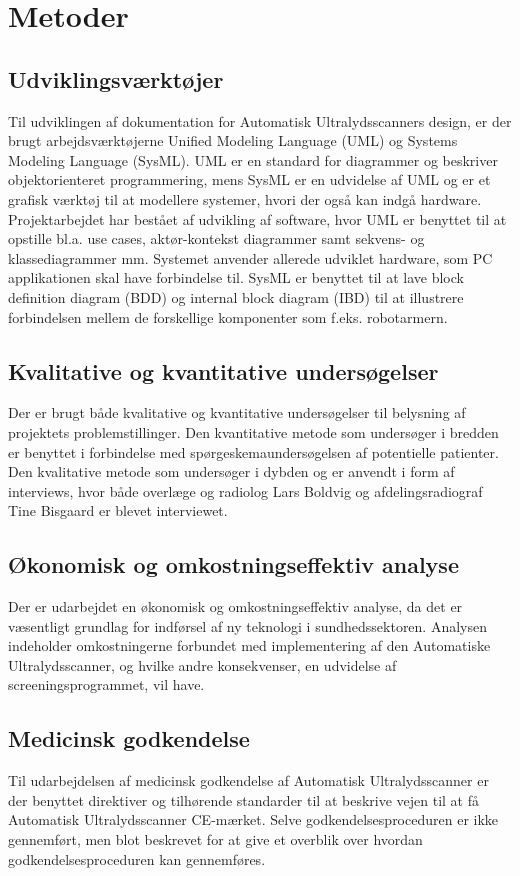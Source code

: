 \chapter{Metoder}\label{Metoder}

\section{Udviklingsværktøjer} 
Til udviklingen af dokumentation for Automatisk Ultralydsscanners design, er der brugt arbejdsværktøjerne Unified Modeling Language (UML) og Systems Modeling Language (SysML). UML er en standard for diagrammer og beskriver objektorienteret programmering, mens SysML er en udvidelse af UML og er et grafisk værktøj til at modellere systemer, hvori der også kan indgå hardware. Projektarbejdet har bestået af udvikling af software, hvor  UML er benyttet til at opstille bl.a. use cases, aktør-kontekst diagrammer samt sekvens- og klassediagrammer mm. Systemet anvender allerede udviklet hardware, som PC applikationen skal have forbindelse til. SysML er benyttet til at lave block definition diagram (BDD) og internal block diagram (IBD) til at illustrere forbindelsen mellem de forskellige komponenter som f.eks. robotarmern. \cite{UML} \cite{SysML}

\section{Kvalitative og kvantitative undersøgelser}
Der er brugt både kvalitative og kvantitative undersøgelser til belysning af projektets problemstillinger. Den kvantitative metode som undersøger i bredden er benyttet i forbindelse med spørgeskemaundersøgelsen af potentielle patienter. Den kvalitative metode som undersøger i dybden og er anvendt i form af interviews, hvor både overlæge og radiolog Lars Boldvig og afdelingsradiograf Tine Bisgaard er blevet interviewet. 

\section{Økonomisk og omkostningseffektiv analyse}
Der er udarbejdet en økonomisk og omkostningseffektiv analyse, da det er væsentligt grundlag for indførsel af ny teknologi i sundhedssektoren. Analysen indeholder omkostningerne forbundet med implementering af den Automatiske Ultralydsscanner, og hvilke andre konsekvenser, en udvidelse af screeningsprogrammet, vil have. 

\section{Medicinsk godkendelse}
Til udarbejdelsen af medicinsk godkendelse af Automatisk Ultralydsscanner er der benyttet direktiver og tilhørende standarder til at beskrive vejen til at få Automatisk Ultralydsscanner CE-mærket. Selve godkendelsesproceduren er ikke gennemført, men blot beskrevet for at give et overblik over hvordan godkendelsesproceduren kan gennemføres. 